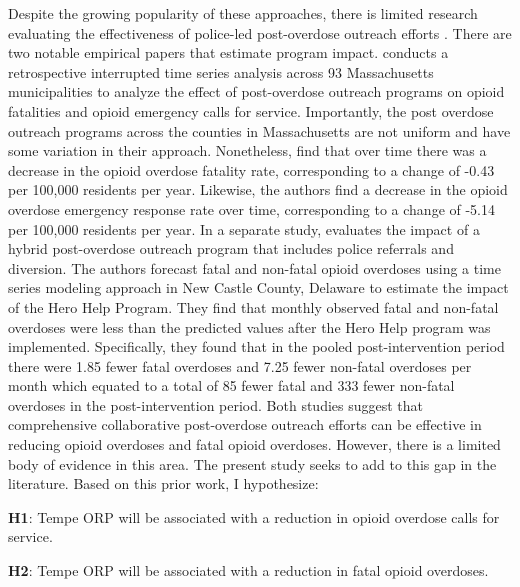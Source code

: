 Despite the growing popularity of these approaches, there is limited research evaluating the effectiveness of police-led post-overdose outreach efforts \parencite{bailey_scoping_2023, yatsco_developing_2020}. There are two notable empirical papers that estimate program impact. \textcite{xuan_association_2023} conducts a retrospective interrupted time series analysis across 93 Massachusetts municipalities to analyze the effect of post-overdose outreach programs on opioid fatalities and opioid emergency calls for service. Importantly, the post overdose outreach programs across the counties in Massachusetts are not uniform and have some variation in their approach. Nonetheless, \textcite{xuan_association_2023} find that over time there was a decrease in the opioid overdose fatality rate, corresponding to a change of -0.43 per 100,000 residents per year. Likewise, the authors find a decrease in the opioid overdose emergency response rate over time, corresponding to a change of -5.14 per 100,000 residents per year. In a separate study, \textcite{donnelly_law_2022} evaluates the impact of a hybrid post-overdose outreach program that includes police referrals and diversion. The authors forecast fatal and non-fatal opioid overdoses using a time series modeling approach in New Castle County, Delaware to estimate the impact of the Hero Help Program. They find that monthly observed fatal and non-fatal overdoses were less than the predicted values after the Hero Help program was implemented. Specifically, they found that in the pooled post-intervention period there were 1.85 fewer fatal overdoses and 7.25 fewer non-fatal overdoses per month which equated to a total of 85 fewer fatal and 333 fewer non-fatal overdoses in the post-intervention period. Both studies suggest that comprehensive collaborative post-overdose outreach efforts can be effective in reducing opioid overdoses and fatal opioid overdoses. However, there is a limited body of evidence in this area. The present study seeks to add to this gap in the literature. Based on this prior work, I hypothesize: 

\begin{flushleft}
\noindent \textbf{H1}: Tempe ORP will be associated with a reduction in opioid overdose calls for service.
\end{flushleft}

\begin{flushleft}
\noindent \textbf{H2}: Tempe ORP will be associated with a reduction in fatal opioid overdoses.
\end{flushleft}

